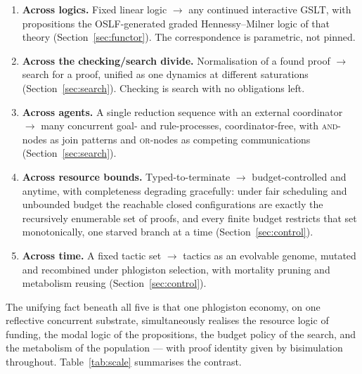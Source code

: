 \documentclass[11pt]{article}
\theoremstyle{definition}
\theoremstyle{plain}
\begin{document}
\begin{enumerate}[label=\textbf{S\arabic*.},leftmargin=2.6em]
\item \textbf{Across logics.} Fixed linear logic $\rightarrow$ any continued
interactive GSLT, with propositions the OSLF-generated graded Hennessy--Milner
logic of that theory (Section~\ref{sec:functor}). The correspondence is
parametric, not pinned.

\item \textbf{Across the checking/search divide.} Normalisation of a found proof
$\rightarrow$ search for a proof, unified as one dynamics at different
saturations (Section~\ref{sec:search}). Checking is search with no obligations
left.

\item \textbf{Across agents.} A single reduction sequence with an external
coordinator $\rightarrow$ many concurrent goal- and rule-processes,
coordinator-free, with \textsc{and}-nodes as join patterns and \textsc{or}-nodes
as competing communications (Section~\ref{sec:search}).

\item \textbf{Across resource bounds.} Typed-to-terminate $\rightarrow$
budget-controlled and anytime, with completeness degrading gracefully: under fair
scheduling and unbounded budget the reachable closed configurations are exactly
the recursively enumerable set of proofs, and every finite budget restricts that
set monotonically, one starved branch at a time (Section~\ref{sec:control}).

\item \textbf{Across time.} A fixed tactic set $\rightarrow$ tactics as an
evolvable genome, mutated and recombined under phlogiston selection, with
mortality pruning and metabolism reusing (Section~\ref{sec:control}).
\end{enumerate}

\noindent
The unifying fact beneath all five is that one phlogiston economy, on one
reflective concurrent substrate, simultaneously realises the resource logic of
funding, the modal logic of the propositions, the budget policy of the search,
and the metabolism of the population --- with proof identity given by
bisimulation throughout. Table~\ref{tab:scale} summarises the contrast.
\end{document}
